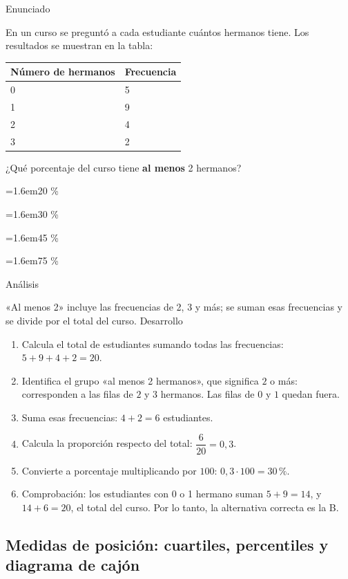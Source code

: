 \documentclass[10pt,a4paper,twocolumn]{article}
\newcommand{\alternativa}[2]{\par\noindent\hangindent=1.6em\hangafter=1\makebox[1.6em][l]{\tecla{#1}}#2\par}
\newcommand{\clave}[1]{\par\smallskip{\sffamily\footnotesize\color{esmeralda} Clave \teclaok{#1}}\par}
\begin{document}
\begin{ejemplo}
{\sffamily\footnotesize\color{zinc500} Enunciado}\par
En un curso se preguntó a cada estudiante cuántos hermanos tiene. Los resultados se muestran en la tabla:

\begin{center}\small
\begin{tabular}{@{}ll@{}}
\toprule
\textbf{Número de hermanos} & \textbf{Frecuencia} \\
\midrule
0 & 5 \\
1 & 9 \\
2 & 4 \\
3 & 2 \\
\bottomrule
\end{tabular}
\end{center}

¿Qué porcentaje del curso tiene \textbf{al menos} 2 hermanos?
\alternativa{A}{20 \%}
\alternativa{B}{30 \%}
\alternativa{C}{45 \%}
\alternativa{D}{75 \%}
\clave{B}
{\sffamily\footnotesize\color{zinc500} Análisis}\par «Al menos 2» incluye las frecuencias de 2, 3 y más; se suman esas frecuencias y se divide por el total del curso.
{\sffamily\footnotesize\color{zinc500} Desarrollo}
\begin{enumerate}
  \item Calcula el total de estudiantes sumando todas las frecuencias: $5 + 9 + 4 + 2 = 20$.
  \item Identifica el grupo «al menos 2 hermanos», que significa $2$ o más: corresponden a las filas de $2$ y $3$ hermanos. Las filas de $0$ y $1$ quedan fuera.
  \item Suma esas frecuencias: $4 + 2 = 6$ estudiantes.
  \item Calcula la proporción respecto del total: $\dfrac{6}{20} = 0{,}3$.
  \item Convierte a porcentaje multiplicando por $100$: $0{,}3\cdot 100 = 30\,\%$.
  \item Comprobación: los estudiantes con 0 o 1 hermano suman $5 + 9 = 14$, y $14 + 6 = 20$, el total del curso. Por lo tanto, la alternativa correcta es la B.
\end{enumerate}
\end{ejemplo}

\subsection{Medidas de posición: cuartiles, percentiles y diagrama de cajón}
\end{document}
